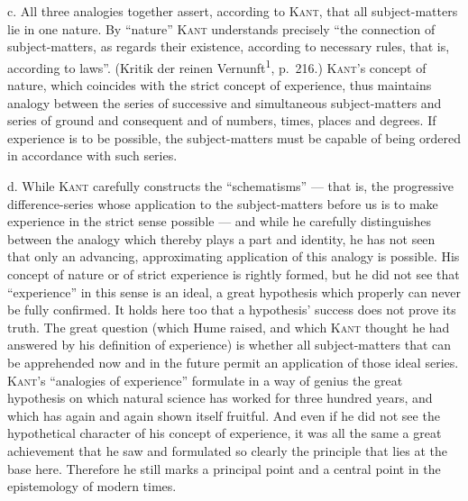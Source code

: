 \documentclass[12pt]{book}
\newcommand{\opage}[1]{\marginnote{\footnotesize\textit{[#1]}}}
\begin{document}
c. All three analogies together assert, according to \textsc{Kant}, that all
subject-matters lie in one nature. By ``nature'' \textsc{Kant} understands
precisely ``the connection of subject-matters, as regards their existence,
according to necessary rules, that is, according to laws''. (Kritik der reinen
Vernunft\textsuperscript{1}, p.\ 216.) \textsc{Kant}'s concept of nature, which
coincides with the strict concept of experience, thus maintains analogy between
the series of successive and simultaneous subject-matters and series of ground
and consequent and of numbers, times, places and degrees. If experience is to be
possible, the subject-matters must be capable of being ordered in accordance with
such series.

d. While \textsc{Kant} carefully constructs the ``schematisms'' --- that is, the
progressive difference-series whose application to the subject-matters before us
is to make experience in the strict sense possible --- and while he carefully
distinguishes between the analogy which thereby plays a part and identity, he has
not seen that only an advancing, approximating application of this analogy is
possible. His concept of nature or of strict experience is rightly formed, but he
did not see that ``experience'' in this sense is an ideal, a great hypothesis
which properly can never be fully confirmed. It holds here too that a hypothesis'
success does not prove its \opage{94}truth. The great question (which Hume raised, and
which \textsc{Kant} thought he had answered by his definition of experience) is
whether all subject-matters that can be apprehended now and in the future permit
an application of those ideal series. \textsc{Kant}'s ``analogies of experience''
formulate in a way of genius the great hypothesis on which natural science has
worked for three hundred years, and which has again and again shown itself
fruitful. And even if he did not see the hypothetical character of his concept of
experience, it was all the same a great achievement that he saw and formulated so
clearly the principle that lies at the base here. Therefore he still marks a
principal point and a central point in the epistemology of modern times.
\end{document}
